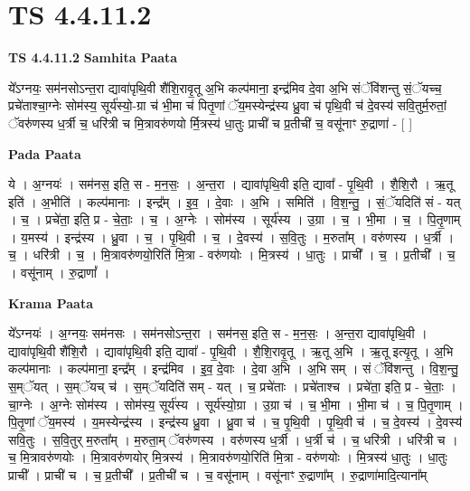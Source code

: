 \documentclass[17pt]{extarticle}
\begin{document}
\section{ TS 4.4.11.2 }

\textbf{TS 4.4.11.2 } \newline
\textbf{Samhita Paata} \newline

ये᳚ऽग्नयः॒ सम॑नसोऽन्त॒रा द्यावा॑पृथि॒वी शै॑शि॒रावृ॒तू अ॒भि कल्प॑माना॒ इन्द्र॑मिव दे॒वा अ॒भि संॅवि॑शन्तु सं॒ॅयच्च॒ प्रचे॑ताश्चा॒ग्नेः सोम॑स्य॒ सूर्य॑स्यो॒-ग्रा च॑ भी॒मा च॑ पितृ॒णां ॅय॒मस्येन्द्र॑स्य ध्रु॒वा च॑ पृथि॒वी च॑ दे॒वस्य॑ सवि॒तुर्म॒रुतां॒ ॅवरु॑णस्य ध॒र्त्री च॒ धरि॑त्री च मि॒त्रावरु॑णयो र्मि॒त्रस्य॑ धा॒तुः प्राची॑ च प्र॒तीची॑ च॒ वसू॑नाꣳ रु॒द्राणा॑ - [  ] \newline

\textbf{Pada Paata} \newline

ये । अ॒ग्नयः॑ । सम॑नस॒ इति॒ स - म॒न॒सः॒ । अ॒न्त॒रा । द्यावा॑पृथि॒वी इति॒ द्यावा᳚ - पृ॒थि॒वी । शै॒शि॒रौ । ऋ॒तू इति॑ । अ॒भीति॑ । कल्प॑मानाः । इन्द्र᳚म् । इ॒व॒ । दे॒वाः । अ॒भि । समिति॑ । वि॒श॒न्तु॒ । सं॒ॅयदिति॑ सं - यत् । च॒ । प्रचे॑ता॒ इति॒ प्र - चे॒ताः॒ । च॒ । अ॒ग्नेः । सोम॑स्य । सूर्य॑स्य । उ॒ग्रा । च॒ । भी॒मा । च॒ । पि॒तृ॒णाम् । य॒मस्य॑ । इन्द्र॑स्य । ध्रु॒वा । च॒ । पृ॒थि॒वी । च॒ । दे॒वस्य॑ । स॒वि॒तुः । म॒रुता᳚म् । वरु॑णस्य । ध॒र्त्री । च॒ । धरि॑त्री । च॒ । मि॒त्रावरु॑णयो॒रिति॑ मि॒त्रा - वरु॑णयोः । मि॒त्रस्य॑ । धा॒तुः । प्राची᳚ । च॒ । प्र॒तीची᳚ । च॒ । वसू॑नाम् । रु॒द्राणां᳚ ।  \newline


\textbf{Krama Paata} \newline

ये᳚ऽग्नयः॑ । अ॒ग्नयः॒ सम॑नसः । सम॑नसोऽन्त॒रा । सम॑नस॒ इति॒ स - म॒न॒सः॒ । अ॒न्त॒रा द्यावा॑पृथि॒वी । द्यावा॑पृथि॒वी शै॑शि॒रौ । द्यावा॑पृथि॒वी इति॒ द्यावा᳚ - पृ॒थि॒वी । शै॒शि॒रावृ॒तू । ऋ॒तू अ॒भि । ऋ॒तू इत्यृ॒तू । अ॒भि कल्प॑मानाः । कल्प॑माना॒ इन्द्र᳚म् । इन्द्र॑मिव । इ॒व॒ दे॒वाः । दे॒वा अ॒भि । अ॒भि सम् । सं ॅवि॑शन्तु । वि॒श॒न्तु॒ स॒म्ॅयत् । स॒म्ॅयच् च॑ । स॒म्ॅयदिति॑ सम् - यत् । च॒ प्रचे॑ताः । प्रचे॑ताश्च । प्रचे॑ता॒ इति॒ प्र - चे॒ताः॒ । चा॒ग्नेः । अ॒ग्नेः सोम॑स्य । सोम॑स्य॒ सूर्य॑स्य । सूर्य॑स्यो॒ग्रा । उ॒ग्रा च॑ । च॒ भी॒मा । भी॒मा च॑ । च॒ पि॒तृ॒णाम् । पि॒तृ॒णां ॅय॒मस्य॑ । य॒मस्येन्द्र॑स्य । इन्द्र॑स्य ध्रु॒वा । ध्रु॒वा च॑ । च॒ पृ॒थि॒वी । पृ॒थि॒वी च॑ । च॒ दे॒वस्य॑ । दे॒वस्य॑ सवि॒तुः । स॒वि॒तुर् म॒रुता᳚म् । म॒रुता॒म् ॅवरु॑णस्य । वरु॑णस्य ध॒र्त्री । ध॒र्त्री च॑ । च॒ धरि॑त्री । धरि॑त्री च । च॒ मि॒त्रावरु॑णयोः । मि॒त्रावरु॑णयोर् मि॒त्रस्य॑ । मि॒त्रावरु॑णयो॒रिति॑ मि॒त्रा - वरु॑णयोः । मि॒त्रस्य॑ धा॒तुः । धा॒तुः प्राची᳚ । प्राची॑ च । च॒ प्र॒तीची᳚ । प्र॒तीची॑ च । च॒ वसू॑नाम् । वसू॑नाꣳ रु॒द्राणा᳚म् । रु॒द्राणा॑मादि॒त्याना᳚म् \newline
\end{document}
